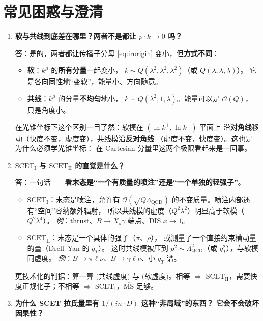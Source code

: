 \documentclass[UTF8,a4paper,11pt]{ctexart}
\theoremstyle{definition}
\theoremstyle{remark}
\theoremstyle{plain}
\newcommand{\muMS}{\overline{\mathrm{MS}}}
\newcommand{\LQCD}{\Lambda_{\mathrm{QCD}}}
\newcommand{\SCETI}{\text{SCET}_{\mathrm{I}}}
\newcommand{\SCETII}{\text{SCET}_{\mathrm{II}}}
\begin{document}
\section{常见困惑与澄清}
\label{sec:confusions}

\begin{enumerate}[label=\textbf{Q\arabic*.}, leftmargin=1.3cm]

\item \textbf{软与共线到底差在哪里？两者不是都让 $p\cdot k\to0$ 吗？}

答：是的，两者都让传播子分母 \eqref{eq:irorigin} 变小，但\textbf{方式不同}：
\begin{itemize}
  \item \textbf{软}：$k^\mu$ 的\textbf{所有分量}一起变小，
        $k\sim Q(\lambda^2,\lambda^2,\lambda^2)$（或 $Q(\lambda,\lambda,\lambda)$）。
        它是各向同性地“变软”，能量小、方向随意。
  \item \textbf{共线}：$k^\mu$ 的分量\textbf{不均匀}地小，
        $k\sim Q(\lambda^2,1,\lambda)$。能量可以是 $\mathcal O(Q)$，
        只是角度小。
\end{itemize}
在光锥坐标下这个区别一目了然：软模在 $(\ln k^+,\ln k^-)$ 平面上
沿\textbf{对角线}移动（快度不变，虚度变），共线模沿\textbf{反对角线}
（虚度不变，快度变）。这也是为什么必须学光锥坐标：
在 Cartesian 分量里这两个极限看起来是一回事。

\item \textbf{$\SCETI$ 与 $\SCETII$ 的直觉是什么？}

答：一句话——\textbf{看末态是“一个有质量的喷注”还是“一个单独的轻强子”}。
\begin{itemize}
  \item \textbf{$\SCETI$}：末态是喷注，允许有 $\mathcal O(\sqrt{Q\LQCD})$
        的不变质量。喷注内部还有“空间”容纳额外辐射，
        所以共线模的虚度（$Q^2\lambda^2$）明显高于软模（$Q^2\lambda^4$）。
        \emph{例}：thrust、$B\to X_s\gamma$ 端点、DIS $x\to1$。
  \item \textbf{$\SCETII$}：末态是一个具体的强子（$\pi$、$\rho$），
        或测量了一个直接约束横动量的量（Drell--Yan 的 $q_T$）。
        这时共线模被压到 $p^2\sim\LQCD^2$（或 $q_T^2$），与软模同虚度。
        \emph{例}：$B\to\pi\ell\nu$、$B\to\gamma\ell\nu$、小 $q_T$ 谱。
\end{itemize}
更技术化的判据：算一算 $($共线虚度$)$ 与 $($软虚度$)$。相等 $\Rightarrow$
$\SCETII$，需要快度正规化子；不相等 $\Rightarrow$ $\SCETI$，$\muMS$ 足够。

\item \textbf{为什么 SCET 拉氏量里有 $1/(i\bar n\cdot D)$ 这种“非局域”的东西？
它会不会破坏因果性？}


\end{enumerate}
\end{document}
